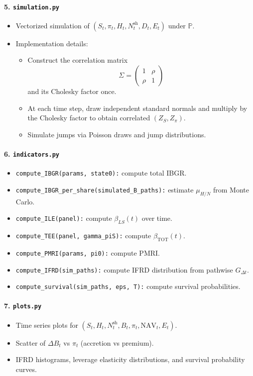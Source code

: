 \documentclass[11pt]{article}
\begin{document}
\paragraph{5. \texttt{simulation.py}}
\begin{itemize}
  \item Vectorized simulation of $(S_t,\pi_t,H_t,N_t^{\text{sh}},D_t,E_t)$ under $\mathbb P$.
  \item Implementation details:
  \begin{itemize}
    \item Construct the correlation matrix
    $$
      \Sigma =
      \begin{pmatrix}
        1 & \rho \\
        \rho & 1
      \end{pmatrix}
    $$
    and its Cholesky factor once.
    \item At each time step, draw independent standard normals and multiply by the Cholesky factor to obtain correlated $(Z_S,Z_\pi)$.
    \item Simulate jumps via Poisson draws and jump distributions.
  \end{itemize}
\end{itemize}

\paragraph{6. \texttt{indicators.py}}
\begin{itemize}
  \item \texttt{compute\_IBGR(params, state0):} compute total IBGR.
  \item \texttt{compute\_IBGR\_per\_share(simulated\_B\_paths):} estimate $\mu_{H/N}$ from Monte Carlo.
  \item \texttt{compute\_ILE(panel):} compute $\beta_{LS}(t)$ over time.
  \item \texttt{compute\_TEE(panel, gamma\_piS):} compute $\beta_{\text{TOT}}(t)$.
  \item \texttt{compute\_PMRI(params, pi0):} compute PMRI.
  \item \texttt{compute\_IFRD(sim\_paths):} compute IFRD distribution from pathwise $G_{\Delta t}$.
  \item \texttt{compute\_survival(sim\_paths, eps, T):} compute survival probabilities.
\end{itemize}

\paragraph{7. \texttt{plots.py}}
\begin{itemize}
  \item Time series plots for $(S_t,H_t,N_t^{\text{sh}},B_t,\pi_t,\text{NAV}_t,E_t)$.
  \item Scatter of $\Delta B_t$ vs $\pi_t$ (accretion vs premium).
  \item IFRD histograms, leverage elasticity distributions, and survival probability curves.
\end{itemize}
\end{document}
